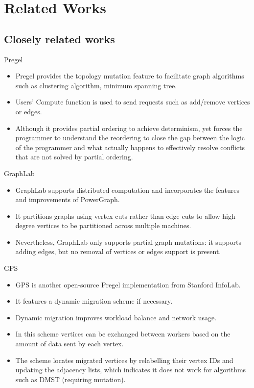\section{Related Works}
\subsection{Closely related works}

\begin{frame}
Pregel
\linebreak
\begin{itemize}
  \item Pregel provides the topology mutation feature to facilitate graph algorithms such as clustering algorithm, minimum spanning tree.
  \item Users' Compute function is used to send requests such as add/remove vertices or edges.
  \item Although it provides partial ordering to achieve determinism, yet forces the programmer to understand the reordering to close the gap between the logic of the programmer and what actually happens to effectively resolve conflicts that are not solved by partial ordering.
  \end{itemize}
\end{frame}

\begin{frame}
GraphLab
\linebreak
	\begin{itemize}
	\item GraphLab supports distributed computation and incorporates the features and improvements of PowerGraph.
	\item It partitions graphs using vertex cuts rather than edge cuts to allow high degree vertices to be partitioned across multiple machines.
	 \item Nevertheless, GraphLab  only supports partial graph mutations: it supports adding edges, but no removal of vertices or edges support is present. 
  	\end{itemize}
\end{frame}

\begin{frame}
GPS
\linebreak
	\begin{itemize}
	\item GPS is another open-source Pregel implementation from Stanford InfoLab.
	 \item It features a dynamic migration scheme if necessary.
	 \item Dynamic migration improves workload balance and network usage.  
	 \item In this scheme vertices can be exchanged between workers based on the amount of data sent by each vertex.
	\item The scheme locates migrated vertices by relabelling their vertex IDs and updating the adjacency lists, which indicates it does not work for algorithms such as DMST (requiring mutation). 
  	\end{itemize}
\end{frame}

